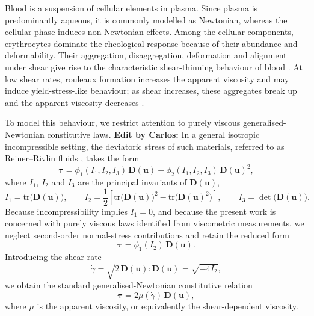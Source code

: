 \documentclass[lineno]{jfm}
\newcommand{\cbp}[1]{{\color{blue} \textbf{Edit by Carlos:} #1}}
\begin{document}
Blood is a suspension of cellular elements in plasma. Since plasma is predominantly aqueous, it is commonly modelled as Newtonian, whereas the cellular phase induces non-Newtonian effects. Among the cellular components, erythrocytes dominate the rheological response because of their abundance and deformability. Their aggregation, disaggregation, deformation and alignment under shear give rise to the characteristic shear-thinning behaviour of blood \citep{haynes1959role,merrill1969rheology,chen2006non,ABUGATTAS2020529}. At low shear rates, rouleaux formation increases the apparent viscosity and may induce yield-stress-like behaviour; as shear increases, these aggregates break up and the apparent viscosity decreases \citep{FORMAGGIA-SPRINGER}.

To model this behaviour, we restrict attention to purely viscous generalised-Newtonian constitutive laws. \cbp{In a general isotropic incompressible setting, the deviatoric stress of such materials, referred to as Reiner--Rivlin fluids \citep{FORMAGGIA-SPRINGER,Sequeria2018}, takes the form}
\begin{equation}
\boldsymbol{\tau}=\phi_1(I_1,I_2,I_3)\,\boldsymbol{D}(\boldsymbol{u})+\phi_2(I_1,I_2,I_3)\,\boldsymbol{D}(\boldsymbol{u})^2,\label{eq:tau_general}
\end{equation}
where $I_1$, $I_2$ and $I_3$ are the principal invariants of $\boldsymbol{D}(\boldsymbol{u})$,
\begin{equation}
I_1=\mathrm{tr}\bigl(\boldsymbol{D}(\boldsymbol{u})\bigr),\qquad
I_2=\frac{1}{2}\left[\mathrm{tr}\bigl(\boldsymbol{D}(\boldsymbol{u})\bigr)^2-\mathrm{tr}\bigl(\boldsymbol{D}(\boldsymbol{u})^2\bigr)\right],\qquad
I_3=\det\bigl(\boldsymbol{D}(\boldsymbol{u})\bigr).\label{eq:invariants}
\end{equation}
Because incompressibility implies $I_1=0$, and because the present work is concerned with purely viscous laws identified from viscometric measurements, we neglect second-order normal-stress contributions and retain the reduced form
\begin{equation}
\boldsymbol{\tau}=\phi_1(I_2)\,\boldsymbol{D}(\boldsymbol{u}).\label{eq:final_deviatoric}
\end{equation}
Introducing the shear rate
\begin{equation}
\dot{\gamma}=\sqrt{2\,\boldsymbol{D}(\boldsymbol{u}):\boldsymbol{D}(\boldsymbol{u})}=\sqrt{-4I_2},\label{eq:shear-rate}
\end{equation}
we obtain the standard generalised-Newtonian constitutive relation
\begin{equation}
\boldsymbol{\tau}=2\mu(\dot{\gamma})\,\boldsymbol{D}(\boldsymbol{u}),\label{eq:gnf}
\end{equation}
where $\mu$ is the apparent viscosity, or equivalently the shear-dependent viscosity.
\end{document}
